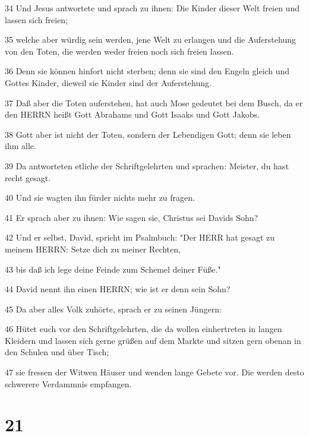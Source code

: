 \par 34 Und Jesus antwortete und sprach zu ihnen: Die Kinder dieser Welt freien und lassen sich freien;
\par 35 welche aber würdig sein werden, jene Welt zu erlangen und die Auferstehung von den Toten, die werden weder freien noch sich freien lassen.
\par 36 Denn sie können hinfort nicht sterben; denn sie sind den Engeln gleich und Gottes Kinder, dieweil sie Kinder sind der Auferstehung.
\par 37 Daß aber die Toten auferstehen, hat auch Mose gedeutet bei dem Busch, da er den HERRN heißt Gott Abrahams und Gott Isaaks und Gott Jakobs.
\par 38 Gott aber ist nicht der Toten, sondern der Lebendigen Gott; denn sie leben ihm alle.
\par 39 Da antworteten etliche der Schriftgelehrten und sprachen: Meister, du hast recht gesagt.
\par 40 Und sie wagten ihn fürder nichts mehr zu fragen.
\par 41 Er sprach aber zu ihnen: Wie sagen sie, Christus sei Davids Sohn?
\par 42 Und er selbst, David, spricht im Psalmbuch: "Der HERR hat gesagt zu meinem HERRN: Setze dich zu meiner Rechten,
\par 43 bis daß ich lege deine Feinde zum Schemel deiner Füße."
\par 44 David nennt ihn einen HERRN; wie ist er denn sein Sohn?
\par 45 Da aber alles Volk zuhörte, sprach er zu seinen Jüngern:
\par 46 Hütet euch vor den Schriftgelehrten, die da wollen einhertreten in langen Kleidern und lassen sich gerne grüßen auf dem Markte und sitzen gern obenan in den Schulen und über Tisch;
\par 47 sie fressen der Witwen Häuser und wenden lange Gebete vor. Die werden desto schwerere Verdammnis empfangen.

\chapter{21}

